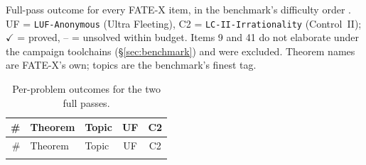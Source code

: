 \documentclass[12pt, a4paper]{article}
\newcommand{\run}[1]{\texttt{#1}}
\newcommand{\cmark}{$\checkmark$}
\begin{document}
Full-pass outcome for every FATE-X item, in the benchmark's difficulty order
\cite{fatex2025}. UF = \run{LUF-Anonymous} (Ultra Fleeting), C2 =
\run{LC-II-Irrationality} (Control~II); \cmark{} = proved, -- = unsolved
within budget. Items 9 and 41 do not elaborate under the campaign toolchains
(\S\ref{sec:benchmark}) and were excluded. Theorem names are FATE-X's own;
topics are the benchmark's finest tag.

\begingroup\footnotesize
\setlength{\tabcolsep}{4pt}
\begin{longtable}{@{}rllcc@{}}
\caption{Per-problem outcomes for the two full passes.}
\label{tab:allitems}\\
\toprule
\# & Theorem & Topic & UF & C2 \\
\midrule
\endfirsthead
\toprule
\# & Theorem & Topic & UF & C2 \\
\midrule
\endhead
\bottomrule
\endfoot

\end{longtable}
\endgroup
\end{document}
